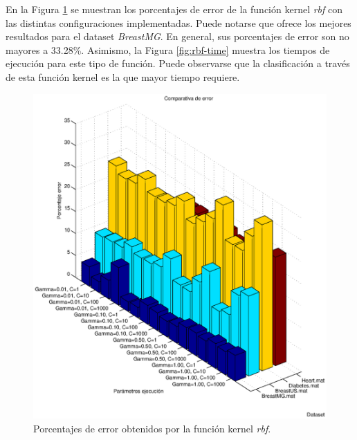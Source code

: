 \documentclass[spanish,12pt]{article}
\begin{document}
En la Figura \ref{fig:rbf-error} se muestran los porcentajes de error de la función kernel \emph{rbf} con las distintas configuraciones implementadas.
Puede notarse que ofrece los mejores resultados para el dataset \emph{BreastMG}.
En general, sus porcentajes de error son no mayores a 33.28\%.
Asimismo, la Figura \ref{fig:rbf-time} muestra los tiempos de ejecución para este tipo de función.
Puede observarse que la clasificación a través de esta función kernel es la que mayor tiempo requiere.
\begin{figure}
        \centering
        \includegraphics[width=\textwidth]{imagenes/rbf-error}
        \caption{Porcentajes de error obtenidos por la función kernel \emph{rbf}.}\label{fig:rbf-error}
\end{figure}
\end{document}
